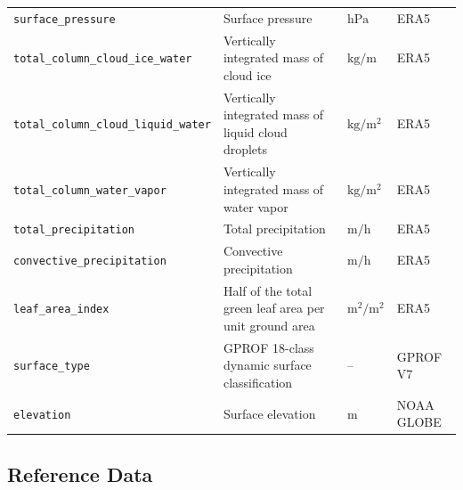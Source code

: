 \documentclass[11pt]{article}
\begin{document}
\begin{table}[htbp]
\begin{tabular}{lp{4cm}ll}
		\texttt{surface\_pressure}                   & Surface pressure                                       & $\si{\hecto \pascal}$                       & ERA5            \\
		\texttt{total\_column\_cloud\_ice\_water}    & Vertically integrated mass of cloud ice                & $\si{\kilo \gram \per \meter}$              & ERA5            \\
		\texttt{total\_column\_cloud\_liquid\_water} & Vertically integrated mass of liquid cloud droplets    & $\si{\kilo \gram \per \meter \squared}$     & ERA5            \\
		\texttt{total\_column\_water\_vapor}         & Vertically integrated mass of water vapor              & $\si{\kilo \gram \per \meter \squared}$     & ERA5            \\
		\texttt{total\_precipitation}                & Total precipitation                                    & $\si{\meter \per \hour}$                    & ERA5            \\
		\texttt{convective\_precipitation}           & Convective precipitation                               & $\si{\meter \per \hour}$                    & ERA5            \\
		\texttt{leaf\_area\_index}                   & Half of the total green leaf area per unit ground area & $\si{\meter \squared \per \meter \squared}$ & ERA5            \\
		\texttt{surface\_type}                       & GPROF 18-class dynamic surface classification          & --                                          & GPROF V7        \\
		\texttt{elevation}                           & Surface elevation                                      & $\si{\meter}$                               & NOAA GLOBE      \\
		\bottomrule
	\end{tabular}
\end{table}


\subsection{Reference Data}
\end{document}
